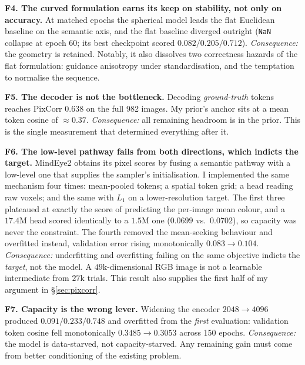 \documentclass[11pt,a4paper]{article}
\theoremstyle{plain}
\theoremstyle{remark}
\newenvironment{finding}[1]%
  {\medskip\noindent\textbf{#1}\quad}%
  {\medskip}
\begin{document}
\begin{finding}{F4. The curved formulation earns its keep on stability, not only on accuracy.}
At matched epochs the spherical model leads the flat Euclidean baseline on the
semantic axis, and the flat baseline diverged outright (\texttt{NaN} collapse at
epoch 60; its best checkpoint scored $0.082 / 0.205 / 0.712$).
\emph{Consequence:} the geometry is retained. Notably, it also dissolves two
correctness hazards of the flat formulation: guidance anisotropy under
standardisation, and the temptation to normalise the sequence.
\end{finding}

\begin{finding}{F5. The decoder is not the bottleneck.}
Decoding \emph{ground-truth} tokens reaches PixCorr $0.638$ on the full 982
images. My prior's anchor sits at a mean token cosine of $\approx\!0.37$.
\emph{Consequence:} all remaining headroom is in the prior. This is the single
measurement that determined everything after it.
\end{finding}

\begin{finding}{F6. The low-level pathway fails from both directions, which indicts the target.}
MindEye2 obtains its pixel scores by fusing a semantic pathway with a low-level
one that supplies the sampler's initialisation. I implemented the same mechanism
four times: mean-pooled tokens; a spatial token grid; a head reading raw voxels;
and the same with $L_1$ on a lower-resolution target. The first three plateaued
at exactly the score of predicting the per-image mean colour, and a $17.4$M head
scored identically to a $1.5$M one ($0.0699$ vs.\ $0.0702$), so capacity was
never the constraint. The fourth removed the mean-seeking behaviour and
overfitted instead, validation error rising monotonically $0.083\!\to\!0.104$.
\emph{Consequence:} underfitting and overfitting failing on the same objective
indicts the \emph{target}, not the model. A $49$k-dimensional RGB image is not a
learnable intermediate from $27$k trials. This result also supplies the first
half of my argument in \S\ref{sec:pixcorr}.
\end{finding}

\begin{finding}{F7. Capacity is the wrong lever.}
Widening the encoder $2048\!\to\!4096$ produced $0.091 / 0.233 / 0.748$ and
overfitted from the \emph{first} evaluation: validation token cosine fell
monotonically $0.3485\!\to\!0.3053$ across 150 epochs.
\emph{Consequence:} the model is data-starved, not capacity-starved. Any
remaining gain must come from better conditioning of the existing problem.
\end{finding}
\end{document}

